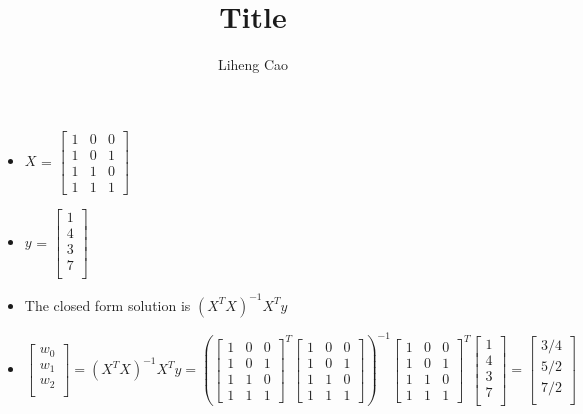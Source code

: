 \documentclass[12pt]{article}
\title{Title}
\author{Liheng Cao}
\begin{document}
\maketitle

\section{}
\begin{itemize}
	\item $X$ = 
	$\begin{bmatrix}
		1 & 0 & 0 \\
		1 & 0 & 1 \\
		1 & 1 & 0 \\
		1 & 1 & 1 
	\end{bmatrix}$

	\item $y$ = 
	$ \begin{bmatrix}
		1 \\
		4 \\
		3 \\
		7 \\
	\end{bmatrix} $

	\item The closed form solution is $ (X^TX)^{-1}X^Ty $
	
	\item $	\begin{bmatrix}
		w_0 \\
		w_1 \\
		w_2 \\ 
	\end{bmatrix} =
	(X^TX)^{-1}X^Ty = 
	\left(\begin{bmatrix}
		1 & 0 & 0 \\
		1 & 0 & 1 \\
		1 & 1 & 0 \\
		1 & 1 & 1 
	\end{bmatrix}^T
	\begin{bmatrix}
	1 & 0 & 0 \\
	1 & 0 & 1 \\
	1 & 1 & 0 \\
	1 & 1 & 1 
	\end{bmatrix}\right)^{-1}
	\begin{bmatrix}
	1 & 0 & 0 \\
	1 & 0 & 1 \\
	1 & 1 & 0 \\
	1 & 1 & 1 
	\end{bmatrix}^T
	\begin{bmatrix}
	1 \\
	4 \\
	3 \\
	7 \\
	\end{bmatrix} = 
	\begin{bmatrix}
		3/4 \\
		5/2 \\
		7/2 \\
	\end{bmatrix}$


\end{itemize}
\end{document}
